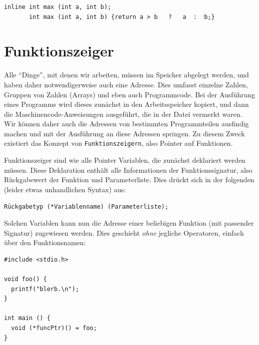 \begin{codebox}
\begin{verbatim}
inline int max (int a, int b);
       int max (int a, int b) {return a > b   ?   a  :  b;}
\end{verbatim}
\end{codebox}

\section{Funktionszeiger} \label{sec:funcPtr}
Alle \enquote{Dinge}, mit denen wir arbeiten, müssen im Speicher abgelegt werden, und haben daher notwendigerweise auch eine Adresse. Dies umfasst einzelne Zahlen, Gruppen von Zahlen (Arrays) und eben auch Programmcode. Bei der Ausführung eines Programms wird dieses zunächst in den Arbeitsspeicher kopiert, und dann die Maschinencode-Anweisungen ausgeführt, die in der Datei vermerkt waren. Wir können daher auch die Adressen von bestimmten Programmteilen ausfindig machen und mit der Ausführung an diese Adressen springen. Zu diesem Zweck existiert das Konzept von \texttt{Funktionszeigern}, also Pointer auf Funktionen.

Funktionszeiger sind wie alle Pointer Variablen, die zunächst deklariert werden müssen. Diese Deklaration enthält alle Informationen der Funktionssignatur, also Rückgabewert der Funktion und Parameterliste. Dies drückt sich in der folgenden (leider etwas unhandlichen Syntax) aus:
\begin{codebox}
\begin{verbatim}
Rückgabetyp (*Variablenname) (Parameterliste);
\end{verbatim}
\end{codebox}

Solchen Variablen kann nun die Adresse einer beliebigen Funktion (mit passender Signatur) zugewiesen werden. Dies geschieht \emph{ohne} jegliche Operatoren, einfach über den Funktionsnamen:

\begin{codebox}
\begin{verbatim}
#include <stdio.h>

void foo() {
  printf("blerb.\n");
}

int main () {
  void (*funcPtr)() = foo;
}
\end{verbatim}
\end{codebox}

